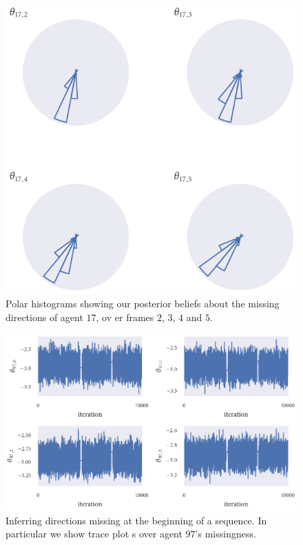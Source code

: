 \begin{figure}[!tbp]
	\includegraphics{output/seq05_polar_hist_end_miss_i=17.pdf}
	\caption{Polar histograms showing our posterior beliefs about the missing directions of agent $17$, ov
er frames $2$, $3$, $4$ and $5$.}
	\label{fig:seq05_polar_hist_end_miss_i=17}
\end{figure}
\begin{figure}[!tbp]
	\includegraphics{output/seq05_trace_beg_miss_i=97.pdf}
	\caption{Inferring directions missing at the beginning of a sequence. In particular we show trace plot
s over agent $97$'s missingness.}
	\label{fig:seq05_trace_beg_miss_i=97}
\end{figure}
